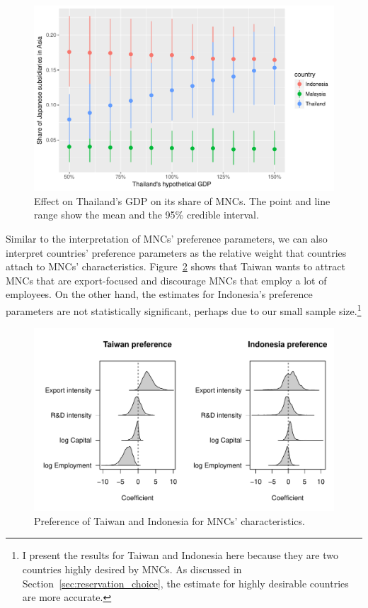 \begin{figure}[tbp]
  \centering
  \includegraphics[width=\textwidth,keepaspectratio]{../figure/japan96_effect_GDP_on_share_of_MNCs}
  \caption[Effect of Thailand's GDP on its share of MNCs.]{Effect on Thailand's
    GDP on its share of MNCs. The point and line range show the mean and the
    95\% credible interval.}
  \label{fig:japan96_effect_GDP_on_share_of_MNCs}
\end{figure}

Similar to the interpretation of MNCs' preference parameters, we can also
interpret countries' preference parameters as the relative weight that countries
attach to MNCs' characteristics. Figure~\ref{fig:japan96_beta_Taiwan_Indonesia}
shows that Taiwan wants to attract MNCs that are export-focused and discourage
MNCs that employ a lot of employees. On the other hand, the estimates for
Indonesia's preference parameters are not statistically significant, perhaps due
to our small sample size.\footnote{I present the results for Taiwan and
  Indonesia here because they are two countries highly desired by MNCs. As
  discussed in Section~\ref{sec:reservation_choice}, the estimate for highly
  desirable countries are more accurate.}

\begin{figure}[tbp]
  \centering
  \includegraphics[width=\textwidth,keepaspectratio]{../figure/japan96_beta_Taiwan_Indonesia}
  \caption[Preference of Taiwan and Indonesia.]{Preference of Taiwan and
    Indonesia for MNCs' characteristics.}
  \label{fig:japan96_beta_Taiwan_Indonesia}
\end{figure}

